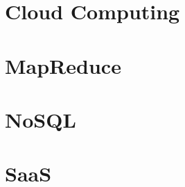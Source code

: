\part{Cloud Computing}


%

%





\part{MapReduce}



\part{NoSQL}



\part{SaaS}
\label{sec:icloud-saas}



%
%

